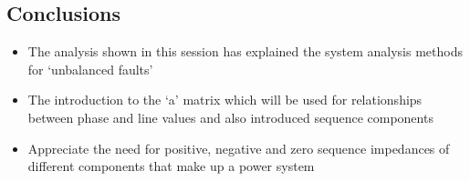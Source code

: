 \subsection{Conclusions}
\begin{itemize}
	\item The analysis shown in this session has explained the system analysis methods for `unbalanced faults'
	\item The introduction to the `a' matrix which will be used for relationships between phase and line values and also introduced sequence components
	\item Appreciate the need for positive, negative and zero sequence impedances of different components that make up a power system
\end{itemize}













